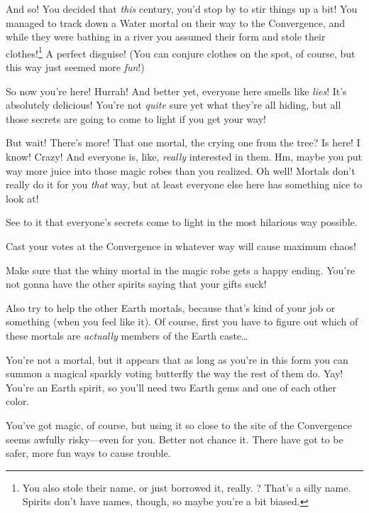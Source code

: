 \documentclass[char]{iron}
\begin{document}
And so! You decided that \emph{this} century, you'd stop by to stir things up a bit! You managed to track down a Water mortal on their way to the Convergence, and while they were bathing in a river you assumed their form and stole their clothes!\footnote{You also stole their name, or just borrowed it, really. \cTrickster{\real{\intro}}? That's a silly name. Spirits don't have names, though, so maybe you're a bit biased.} A perfect disguise! (You can conjure clothes on the spot, of course, but this way just seemed more \emph{fun}!)

So now you're here! Hurrah! And better yet, everyone here smells like \emph{lies}! It's absolutely delicious! You're not \emph{quite} sure yet what they're all hiding, but all those secrets are going to come to light if you get your way!

But wait! There's more! That one mortal, the crying one from the tree? Is here! I know! Crazy! And everyone is, like, \emph{really} interested in them. Hm, maybe you put way more juice into those magic robes than you realized. Oh well! Mortals don't really do it for you \emph{that} way, but at least everyone else here has something nice to look at!

\begin{itemz}[Goals]
\item See to it that everyone's secrets come to light in the most hilarious way possible.
\item Cast your votes at the Convergence in whatever way will cause maximum chaos!
\item Make sure that the whiny mortal in the magic robe gets a happy ending. You're not gonna have the other spirits saying that your gifts suck!
\item Also try to help the other Earth mortals, because that's kind of your job or something (when you feel like it). Of course, first you have to figure out which of these mortals are \emph{actually} members of the Earth caste\ldots{}
\end{itemz}
    
\begin{itemz}[Notes]
\item You're not a mortal, but it appears that as long as you're in this form you can summon a magical sparkly voting butterfly the way the rest of them do. Yay! You're an Earth spirit, so you'll need two Earth gems and one of each other color.
\item You've got magic, of course, but using it so close to the site of the Convergence seems awfully risky---even for you. Better not chance it. There have got to be safer, more fun ways to cause trouble.
\end{itemz}
\end{document}
